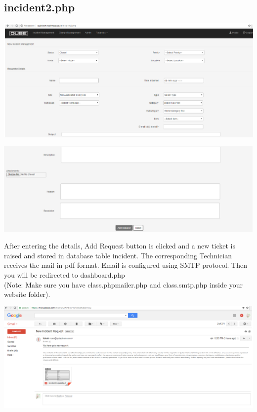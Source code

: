 \documentclass{article}
\begin{document}
\subsection{incident2.php}
\begin{center}

    \includegraphics[width=7.0in]{incident.png}
   
    \label{}

\end{center}
\begin{center}

    \includegraphics[width=7.0in]{incident1.png}
   
    \label{}

\end{center}
After entering the details, Add Request button is clicked and a new ticket is raised and stored in database table incident. The corresponding Technician receives the mail in pdf format. Email is configured using SMTP protocol. Then you will be redirected to dashboard.php\\
\big(Note: Make sure you have class.phpmailer.php and class.smtp.php inside your website folder\big).
\begin{center}

    \includegraphics[width=7.0in]{mail.png}
   
    \label{}

\end{center}
\end{document}
